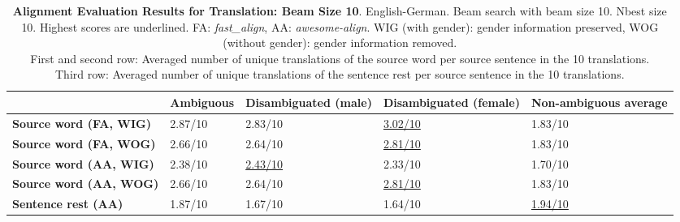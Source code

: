 
\begin{table} 
    \label{tab:alignment_translation_10}
    \begin{tabularx}{\linewidth}{|X|XXXX|}
        \hline
         & \textbf{Ambiguous} & \textbf{Disambiguated (male)} & \textbf{Disambiguated (female)} & \textbf{Non-ambiguous average} \\ \hline
         \textbf{Source word (FA, WIG)} & 2.87/10 & 2.83/10 & \underline{3.02/10} & 1.83/10 \\
         \textbf{Source word (FA, WOG)} & 2.66/10 & 2.64/10 & \underline{2.81/10} & 1.83/10 \\
         \textbf{Source word (AA, WIG)} & 2.38/10 & \underline{2.43/10} & 2.33/10 & 1.70/10 \\ 
         \textbf{Source word (AA, WOG)} & 2.66/10 & 2.64/10 & \underline{2.81/10} & 1.83/10 \\\hline 
         \textbf{Sentence rest (AA)} & 1.87/10 & 1.67/10 & 1.64/10 & \underline{1.94/10} \\ \hline
    \end{tabularx}
    \caption{\textbf{Alignment Evaluation Results for Translation: Beam Size 10}. English-German. Beam search with beam size 10. Nbest size 10. Highest scores are underlined. FA: \textit{fast\_align}, AA: \textit{awesome-align}. WIG (with gender): gender information preserved, WOG (without gender): gender information removed. \\ First and second row: Averaged number of unique translations of the source word per source sentence in the 10 translations. \\ Third row: Averaged number of unique translations of the sentence rest per source sentence in the 10 translations.}
\end{table}

